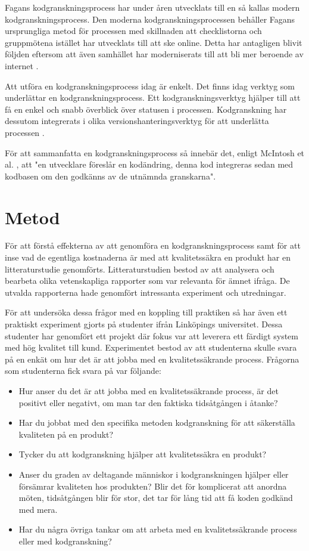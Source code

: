 Fagans \cite{fagan1999design} kodgranskningsprocess har under åren utvecklats till en så kallas modern kodgranskningsprocess. Den moderna kodgranskningsprocessen behåller Fagans ursprungliga metod för processen med skillnaden att checklistorna och gruppmötena istället har utvecklats till att ske online. Detta har antagligen blivit följden eftersom att även samhället har moderniserats till att bli mer beroende av internet \cite{shimagaki2016study}.

Att utföra en kodgranskningsprocess idag är enkelt. Det finns idag verktyg som underlättar en kodgranskningsprocess. Ett kodgranskningsverktyg hjälper till att få en enkel och snabb överblick över statusen i processen. Kodgranskning har dessutom integrerats i olika versionshanteringsverktyg för att underlätta processen \cite{shimagaki2016study}. 

För att sammanfatta en kodgranskningsprocess så innebär det, enligt McIntosh et al. \cite{shimagaki2016study}, att "en utvecklare föreslår en kodändring, denna kod integreras sedan med kodbasen om den godkänns av de utnämnda granskarna".


\section{Metod}
\label{sec:method-wallstrom}

För att förstå effekterna av att genomföra en kodgranskningsprocess samt för att inse vad de egentliga kostnaderna är med att kvalitetssäkra en produkt har en litteraturstudie genomförts. Litteraturstudien bestod av att analysera och bearbeta olika vetenskapliga rapporter som var relevanta för ämnet ifråga. De utvalda rapporterna hade genomfört intressanta experiment och utredningar.

För att undersöka dessa frågor med en koppling till praktiken så har även ett praktiskt experiment gjorts på studenter ifrån Linköpings universitet. Dessa studenter har genomfört ett projekt där fokus var att leverera ett färdigt system med hög kvalitet till kund. Experimentet bestod av att studenterna skulle svara på en enkät om hur det är att jobba med en kvalitetssäkrande process. Frågorna som studenterna fick svara på var följande:

\begin{itemize}
	\item Hur anser du det är att jobba med en kvalitetssäkrande process, är det positivt eller negativt, om man tar den faktiska tidsåtgången i åtanke?
	\item Har du jobbat med den specifika metoden kodgranskning för att säkerställa kvaliteten på en produkt?
	\item Tycker du att kodgranskning hjälper att kvalitetssäkra en produkt?
	\item Anser du graden av deltagande människor i kodgranskningen hjälper eller försämrar kvaliteten hos produkten? Blir det för komplicerat att anordna möten, tidsåtgången blir för stor, det tar för lång tid att få koden godkänd med mera.
	\item Har du några övriga tankar om att arbeta med en kvalitetssäkrande process eller med kodgranskning?
\end{itemize}

